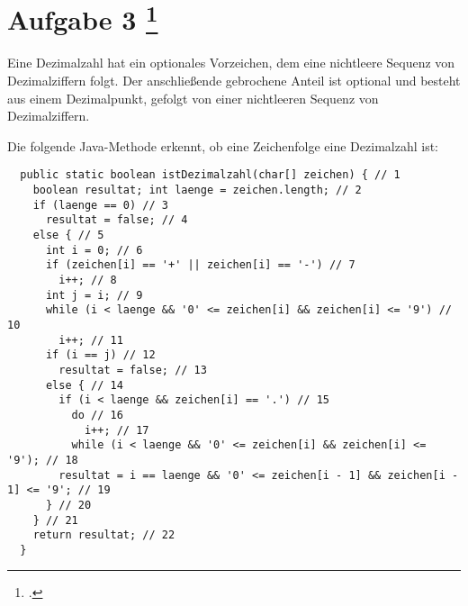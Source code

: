 \documentclass{lehramt-informatik-aufgabe}
\begin{document}
\let\b=\liBedingung
\let\c=\liKontrollCode
\let\f=\liBedingungFalsch
\let\k=\liKontrollTextzeileKnoten
\let\p=\liKontrollKnotenPfad
\let\w=\liBedingungWahr

\section{Aufgabe 3
\footcite{examen:66116:2019:09}}

Eine Dezimalzahl hat ein optionales Vorzeichen, dem eine nichtleere
Sequenz von Dezimalziffern folgt. Der anschließende gebrochene Anteil
ist optional und besteht aus einem Dezimalpunkt, gefolgt von einer
nichtleeren Sequenz von Dezimalziffern.

Die folgende Java-Methode erkennt, ob eine Zeichenfolge eine Dezimalzahl
ist:


\begin{verbatim}
  public static boolean istDezimalzahl(char[] zeichen) { // 1
    boolean resultat; int laenge = zeichen.length; // 2
    if (laenge == 0) // 3
      resultat = false; // 4
    else { // 5
      int i = 0; // 6
      if (zeichen[i] == '+' || zeichen[i] == '-') // 7
        i++; // 8
      int j = i; // 9
      while (i < laenge && '0' <= zeichen[i] && zeichen[i] <= '9') // 10
        i++; // 11
      if (i == j) // 12
        resultat = false; // 13
      else { // 14
        if (i < laenge && zeichen[i] == '.') // 15
          do // 16
            i++; // 17
          while (i < laenge && '0' <= zeichen[i] && zeichen[i] <= '9'); // 18
        resultat = i == laenge && '0' <= zeichen[i - 1] && zeichen[i - 1] <= '9'; // 19
      } // 20
    } // 21
    return resultat; // 22
  }
\end{verbatim}
\end{document}
